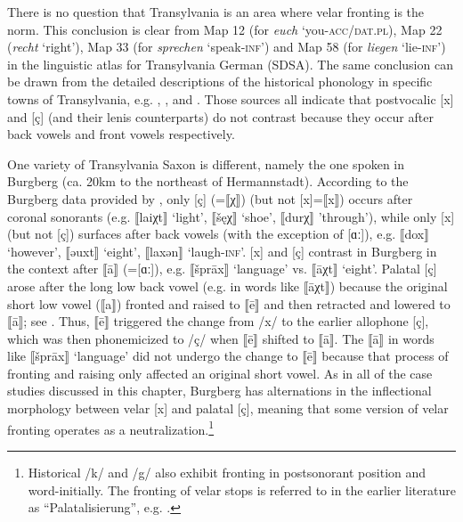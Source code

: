 There is no question that Transylvania is an area where velar fronting is the norm. This conclusion is clear from Map 12 (for \textit{euch} ‘you-\textsc{acc/dat.pl}), Map 22 (\textit{recht} ‘right'), Map 33 (for \textit{sprechen} ‘speak-\textsc{inf}') and Map 58 (for \textit{liegen} ‘lie-\textsc{inf}') in the linguistic atlas for Transylvania German (SDSA). The same conclusion can be drawn from the detailed descriptions of the historical phonology in specific towns of Transylvania, e.g.  \citep{Scheiner1887},  \citep{Kisch1893, Klein1927}, and  \citep{Bruch1966}. Those sources all indicate that postvocalic [x] and [ç] (and their lenis counterparts) do not contrast because they occur after back vowels and front vowels respectively.\largerpage

One variety of Transylvania Saxon is different, namely the one spoken in Burgberg (ca. 20km to the northeast of Hermannstadt). According to the Burgberg data provided by \citet{Maurer1959}, only [ç] (=⟦χ⟧) (but not [x]=⟦x⟧) occurs after coronal sonorants (e.g. ⟦laiχt⟧ ‘light', ⟦šęχ⟧ ‘shoe’,  ⟦durχ⟧ 'through'), while  only [x] (but not [ç]) surfaces after back vowels (with the exception of [ɑː]), e.g. ⟦dox⟧ ‘however’, ⟦əuxt⟧ ‘eight’, ⟦laxən⟧ ‘laugh-\textsc{inf}’. [x] and [ç] contrast in Burgberg in the context after ⟦ā⟧ (=[ɑː]), e.g. ⟦šprāx⟧ ‘language’ vs. ⟦āχt⟧ ‘eight’. Palatal [ç] arose after the long low back vowel (e.g. in words like ⟦āχt⟧) because the original short low vowel (⟦a⟧) fronted and raised to ⟦ē⟧ and then retracted and lowered to ⟦ā⟧; see \citet[12]{Maurer1959}. Thus, ⟦ē⟧ triggered the change from /x/ to the earlier allophone [ç], which was then phonemicized to /ç/ when ⟦ē⟧ shifted to ⟦ā⟧. The ⟦ā⟧ in words like ⟦šprāx⟧ ‘language’ did not undergo the change to ⟦ē⟧ because that process of fronting and raising only affected an original short vowel. As in all of the case studies discussed in this chapter, Burgberg has alternations in the inflectional morphology between velar [x] and palatal [ç], meaning that some version of velar fronting operates as a neutralization.\footnote{Historical /k/ and /g/ also exhibit fronting in postsonorant position and word-initially. The fronting of velar stops is referred to in the earlier literature as “Palatalisierung”, e.g. \citet[75]{Maurer1959}.}

